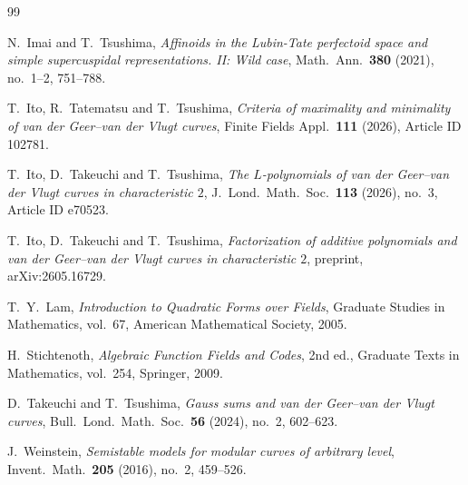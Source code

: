 \documentclass[12pt,a4paper]{amsart}
\theoremstyle{definition}
\theoremstyle{remark}
\begin{document}
\begin{thebibliography}{99}

N.\ Imai and T.\ Tsushima, 
\textit{Affinoids in the Lubin-Tate perfectoid space and simple supercuspidal representations. II: Wild case}, 
Math.\ Ann.\ \textbf{380} (2021),  no.\ 1--2, 751--788.

T.\ Ito, R.\ Tatematsu and T.\ Tsushima,
\textit{Criteria of maximality and minimality of van der Geer--van der Vlugt curves},
Finite Fields Appl.\ \textbf{111} (2026), Article ID 102781.

T.\ Ito, D.\ Takeuchi and T.\ Tsushima,
\textit{The $L$-polynomials of van der Geer--van der Vlugt curves in characteristic $2$},
J.\ Lond.\ Math.\ Soc.\ \textbf{113} (2026), no.~3, Article ID e70523.

T.\ Ito, D.\ Takeuchi and T.\ Tsushima,
\textit{Factorization of additive polynomials and van der Geer--van der Vlugt curves in characteristic $2$}, preprint, arXiv:2605.16729. 




T.~Y.~Lam, 
\textit{Introduction to Quadratic Forms over Fields}, 
Graduate Studies in Mathematics, vol.~67, American Mathematical Society, 2005.



H.\ Stichtenoth, \textit{Algebraic Function Fields and Codes}, 2nd ed., Graduate Texts in Mathematics, vol.\ 254, Springer, 2009.

D.\ Takeuchi and T.\ Tsushima,
\textit{Gauss sums and van der Geer--van der Vlugt curves},
Bull.\ Lond.\ Math.\ Soc.\ \textbf{56} (2024), no.~2, 602--623.

J.\ Weinstein, 
\textit{Semistable models for modular curves of arbitrary level}, 
Invent.\ Math.\ \textbf{205} (2016), no.\ 2, 459--526.

\end{thebibliography}
\end{document}
